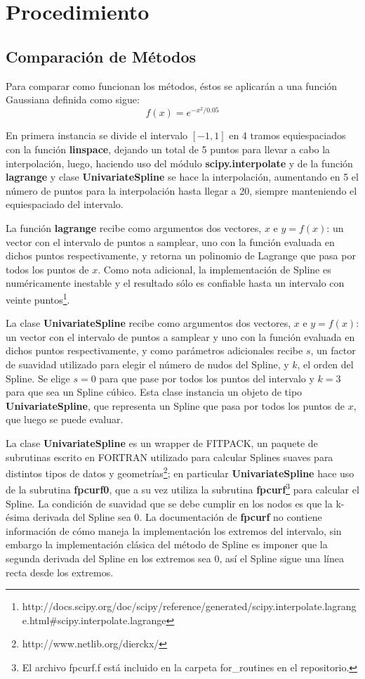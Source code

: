 \documentclass[a4paper, 11pt, spanish]{article}
\begin{document}
\section{Procedimiento}
\subsection{Comparaci\'on de M\'etodos}
Para comparar como funcionan los m\'etodos, \'estos se aplicar\'an a una funci\'on Gaussiana definida como sigue:
\begin{equation}
	f(x) = e^{-x^{2}/0.05}
\end{equation}

En primera instancia se divide el intervalo $[-1,1]$ en 4 tramos equiespaciados con la funci\'on \textbf{linspace}, dejando un total de 5 puntos para llevar a cabo la interpolaci\'on, luego, haciendo uso del m\'odulo \textbf{scipy.interpolate} y de la funci\'on \textbf{lagrange} y clase \textbf{UnivariateSpline} se hace la interpolaci\'on, aumentando en 5 el n\'umero de puntos para la interpolaci\'on hasta llegar a 20, siempre manteniendo el equiespaciado del intervalo.

La funci\'on \textbf{lagrange} recibe como argumentos dos vectores, $x$ e $y = f(x)$: un vector con el intervalo de puntos a samplear, uno con la funci\'on evaluada en dichos puntos respectivamente, y retorna un polinomio de Lagrange que pasa por todos los puntos de $x$. Como nota adicional, la implementaci\'on de Spline es num\'ericamente inestable y el resultado s\'olo es confiable hasta un intervalo con veinte puntos\footnote{http://docs.scipy.org/doc/scipy/reference/generated/scipy.interpolate.lagrange.html\#scipy.interpolate.lagrange}.

La clase \textbf{UnivariateSpline} recibe como argumentos dos vectores, $x$ e $y = f(x)$: un vector con el intervalo de puntos a samplear y uno con la funci\'on evaluada en dichos puntos respectivamente, y como par\'ametros adicionales recibe $s$, un factor de suavidad utilizado para elegir el n\'umero de nudos del Spline, y $k$, el orden del Spline. Se elige $s=0$ para que pase por todos los puntos del intervalo y $k=3$ para que sea un Spline c\'ubico. Esta clase instancia un objeto de tipo \textbf{UnivariateSpline}, que representa un Spline que pasa por todos los puntos de $x$, que luego se puede evaluar.

La clase \textbf{UnivariateSpline} es un wrapper de FITPACK, un paquete de subrutinas escrito en FORTRAN utilizado para calcular Splines suaves para distintos tipos de datos y geometr\'ias\footnote{http://www.netlib.org/dierckx/}; en particular \textbf{UnivariateSpline} hace uso de la subrutina \textbf{fpcurf0}, que a su vez utiliza la subrutina \textbf{fpcurf}\footnote{El archivo fpcurf.f est\'a incluido en la carpeta for\_routines en el repositorio.} para calcular el Spline.
La condici\'on de suavidad que se debe cumplir en los nodos es que la k-\'esima derivada del Spline sea 0. La documentaci\'on de \textbf{fpcurf} no contiene informaci\'on de c\'omo maneja la implementaci\'on los extremos del intervalo, sin embargo la implementaci\'on cl\'asica del m\'etodo de Spline es imponer que la segunda derivada del Spline en los extremos sea 0, as\'i el Spline sigue una l\'inea recta desde los extremos.
\end{document}
